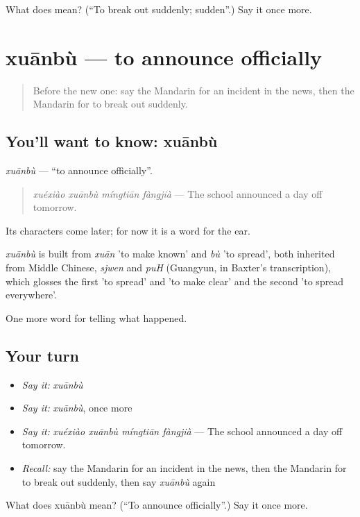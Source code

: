 \begin{tcolorbox}[breakable,colback=teal!4,colframe=teal!35!black,title={Before you move on}]
What does  mean? (\textquotedblleft{}To break out suddenly; sudden\textquotedblright{}.) Say it once more.
\end{tcolorbox}
\section[xuānbù]{xuānbù — to announce officially}

\label{lesson:ZH-C291-xuanbu}



\begin{quote}
Before the new one: say the Mandarin for an incident in the news, then the Mandarin for to break out suddenly.
\end{quote}

\subsection*{You'll want to know: xuānbù}
\emph{xuānbù} — \textquotedblleft{}to announce officially\textquotedblright{}.

\begin{quote}
\emph{xuéxiào xuānbù míngtiān fàngjià} — The school announced a day off tomorrow.
\end{quote}

Its characters come later; for now it is a word for the ear.

\begin{cousinweb}
\emph{xuānbù} is built from \emph{xuān} 'to make known' and \emph{bù} 'to spread', both inherited from Middle Chinese, \emph{sjwen} and \emph{puH} (Guangyun, in Baxter's transcription), which glosses the first 'to spread' and 'to make clear' and the second 'to spread everywhere'.
\end{cousinweb}

\begin{grammarlens}[title={What you've built}]
One more word for telling what happened.
\end{grammarlens}

\subsection*{Your turn}
\begin{itemize}
\raggedright
  \item \emph{Say it:} \emph{xuānbù}
  \item \emph{Say it:} \emph{xuānbù}, once more
  \item \emph{Say it:} \emph{xuéxiào xuānbù míngtiān fàngjià} — The school announced a day off tomorrow.
  \item \emph{Recall:} say the Mandarin for an incident in the news, then the Mandarin for to break out suddenly, then say \emph{xuānbù} again
\end{itemize}

\begin{tcolorbox}[breakable,colback=teal!4,colframe=teal!35!black,title={Before you move on}]
What does xuānbù mean? (\textquotedblleft{}To announce officially\textquotedblright{}.) Say it once more.
\end{tcolorbox}
